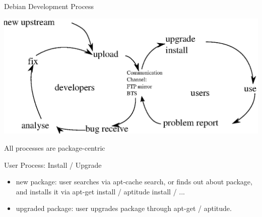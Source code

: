 \documentclass[cjk,dvipdfmx,12pt]{beamer}
\begin{document}
\begin{frame}{Debian Development Process}

\includegraphics[width=1\hsize]{image200805/develcycle.eps} 

All processes are package-centric

\end{frame}

\begin{frame}{User Process: Install / Upgrade}
 \begin{itemize}
  \item new package: 
	user searches via apt-cache search, or finds out about package,
	and installs it via apt-get install / aptitude install / ...
  \item upgraded package:
	user upgrades package through 
	apt-get  / aptitude.	
 \end{itemize}
\end{frame}
\end{document}

